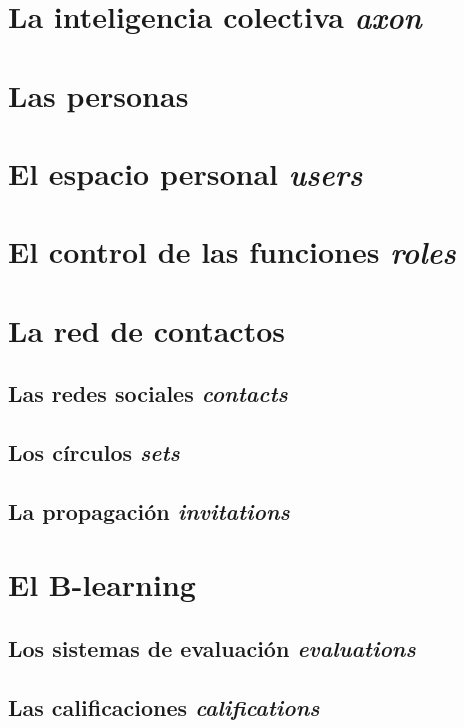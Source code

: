 \section{La inteligencia colectiva \emph{axon}}

\section{Las personas}

\section{El espacio personal \emph{users}}
\section{El control de las funciones \emph{roles}}


\section{La red de contactos}

\subsection{Las redes sociales \emph{contacts}}
\subsection{Los círculos \emph{sets}}
\subsection{La propagación \emph{invitations}}


\section{El B-learning}

\subsection{Los sistemas de evaluación \emph{evaluations}}
\subsection{Las calificaciones \emph{califications}}

